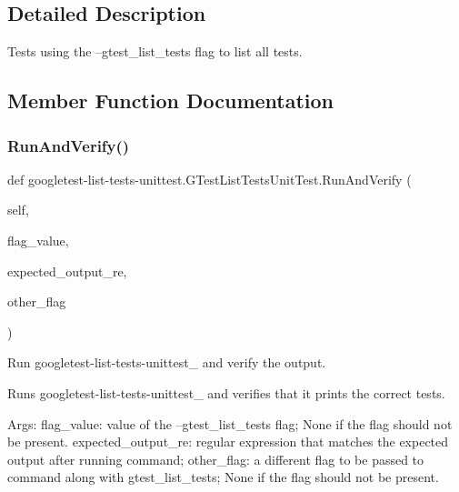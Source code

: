 \subsection{Detailed Description}
\begin{DoxyVerb}Tests using the --gtest_list_tests flag to list all tests.\end{DoxyVerb}
 

\subsection{Member Function Documentation}
\mbox{\label{classgoogletest-list-tests-unittest_1_1GTestListTestsUnitTest_a6630e10404717e8edd3df1439fb0d81c}} 
\subsubsection{\texorpdfstring{Run\+And\+Verify()}{RunAndVerify()}}
{\footnotesize\ttfamily def googletest-\/list-\/tests-\/unittest.\+G\+Test\+List\+Tests\+Unit\+Test.\+Run\+And\+Verify (\begin{DoxyParamCaption}\item[{}]{self,  }\item[{}]{flag\+\_\+value,  }\item[{}]{expected\+\_\+output\+\_\+re,  }\item[{}]{other\+\_\+flag }\end{DoxyParamCaption})}

\begin{DoxyVerb}Run googletest-list-tests-unittest_ and verify the output.

Runs googletest-list-tests-unittest_ and verifies that it prints
the correct tests.

Args:
  flag_value:         value of the --gtest_list_tests flag; None if the flag
should not be present.
  expected_output_re: regular expression that matches the expected output
after running command;
  other_flag:         a different flag to be passed to command along with
gtest_list_tests; None if the flag should not be present.
\end{DoxyVerb}
 \mbox{\label{classgoogletest-list-tests-unittest_1_1GTestListTestsUnitTest_aacba8c9eaef1b649ba40ede17218d0f1}} 
